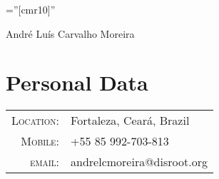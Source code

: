 \documentclass[a4paper,10pt]{article}
\begin{document}

\pagestyle{empty} %

\font\fb=''[cmr10]'' %

\par{\centering
{\Huge André Luís \Huge{Carvalho} Moreira
}\bigskip\par}

\section{Personal Data}

\begin{tabular}{rl}
  \textsc{Location:}   & Fortaleza, Ceará, Brazil \\
  \textsc{Mobile:}     & +55 85 992-703-813\\
  \textsc{email:}     & {andrelcmoreira@disroot.org}
\end{tabular} \\

\end{document}
